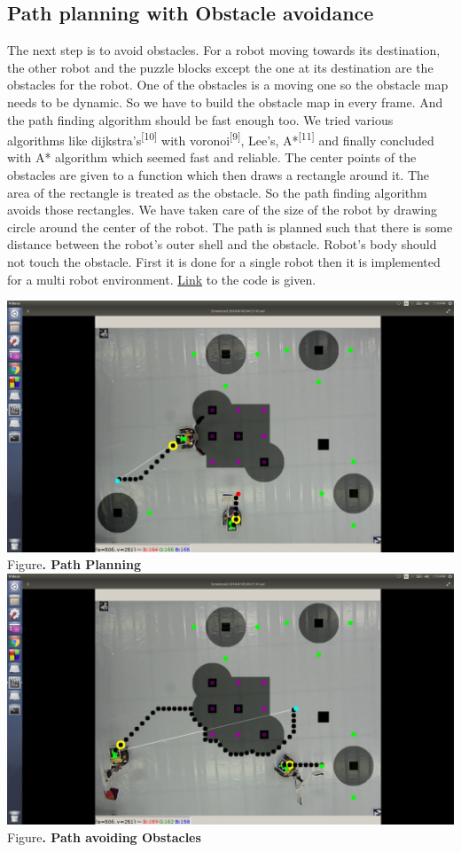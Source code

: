 \documentclass[a4paper,12pt,oneside]{book}
\begin{document}
\subsection*{Path planning with Obstacle avoidance}
The next step is to avoid obstacles. For a robot moving towards its destination, the other robot and the puzzle blocks except the one at its destination are the obstacles for the robot. One of the obstacles is a moving one so the obstacle map needs to be dynamic. So we have to build the obstacle map in every frame. And the path finding algorithm should be fast enough too. We tried various algorithms like dijkstra's\textsuperscript{[10]} with voronoi\textsuperscript{[9]}, Lee's, A*\textsuperscript{[11]} and finally concluded with A* algorithm which seemed fast and reliable. The center points of the obstacles are given to a function which then draws a rectangle around it. The area of the rectangle is treated as the obstacle. So the path finding algorithm avoids those rectangles. We have taken care of the size of the robot by drawing circle around the center of the robot. The path is planned such that there is some distance between the robot's outer shell and the obstacle. Robot's body should not touch the obstacle. First it is done for a single robot then it is implemented for a multi robot environment. \href{https://github.com/eYSIP-2018/Jigsaw_Puzzle_Solver_using_Multiple_Robots/blob/master/Final Codes/Python Codes/path_planning.py}{Link} to the code is given.
\begin{center}
\includegraphics[scale=0.3]{path2.jpg}\\
\small{Figure\textbf{. Path Planning}}\\
\includegraphics[scale=0.3]{path.jpg}\\
\small{Figure\textbf{. Path avoiding Obstacles}}
\end{center}
\end{document}
